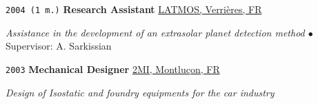 \noindent \texttt{2004 (1 m.)} \tab \textbf{Research Assistant} \tab
\href{https://www3.latmos.ipsl.fr/index.php/fr/accueil-latmos}{LATMOS, Verrières, FR}
\vspace{.3em}
\begin{adjustwidth}{7em}{}
\textit{Assistance in the development of an extrasolar planet detection method $\bullet$} Supervisor: A. Sarkissian
\end{adjustwidth}
\vspace{.5em}

\noindent \texttt{2003} \tab \textbf{Mechanical Designer} \tab
\href{http://www.2migroup.eu/fr/}{2MI, Montluçon, FR}
\vspace{.3em}
\begin{adjustwidth}{7em}{}
\textit{Design of Isostatic and foundry equipments for the car industry}
\end{adjustwidth}